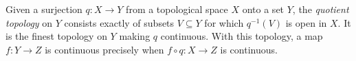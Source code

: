 
Given a surjection $q:X\to Y$ from a topological space $X$ onto a set $Y$, the \emph{quotient topology} on $Y$ consists exactly of subsets $V\subseteq Y$ for which $q^{-1}(V)$ is open in $X$. It is the finest topology on $Y$ making $q$ continuous. With this topology, a map $f:Y\to Z$ is continuous precisely when $f\circ q:X\to Z$ is continuous.
